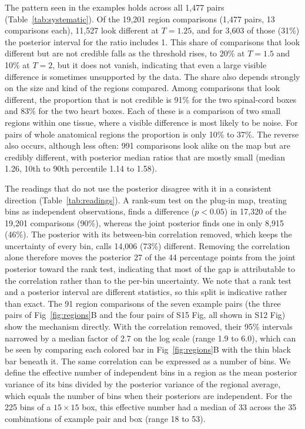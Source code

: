 \documentclass[10pt,letterpaper]{article}
\begin{document}
The pattern seen in the examples holds across all 1,477 pairs (Table~\ref{tab:systematic}). Of the 19,201 region comparisons (1,477 pairs, 13 comparisons each), 11,527 look different at $T = 1.25$, and for 3,603 of those (31\%) the posterior interval for the ratio includes 1. This share of comparisons that look different but are not credible falls as the threshold rises, to 20\% at $T = 1.5$ and 10\% at $T = 2$, but it does not vanish, indicating that even a large visible difference is sometimes unsupported by the data. The share also depends strongly on the size and kind of the regions compared. Among comparisons that look different, the proportion that is not credible is 91\% for the two spinal-cord boxes and 83\% for the two heart boxes. Each of these is a comparison of two small regions within one tissue, where a visible difference is most likely to be noise. For pairs of whole anatomical regions the proportion is only 10\% to 37\%. The reverse also occurs, although less often: 991 comparisons look alike on the map but are credibly different, with posterior median ratios that are mostly small (median 1.26, 10th to 90th percentile 1.14 to 1.58).

The readings that do not use the posterior disagree with it in a consistent direction (Table~\ref{tab:readings}). A rank-sum test on the plug-in map, treating bins as independent observations, finds a difference ($p < 0.05$) in 17,320 of the 19,201 comparisons (90\%), whereas the joint posterior finds one in only 8,915 (46\%). The posterior with its between-bin correlation removed, which keeps the uncertainty of every bin, calls 14,006 (73\%) different. Removing the correlation alone therefore moves the posterior 27 of the 44 percentage points from the joint posterior toward the rank test, indicating that most of the gap is attributable to the correlation rather than to the per-bin uncertainty. We note that a rank test and a posterior interval are different statistics, so this split is indicative rather than exact. The 91 region comparisons of the seven example pairs (the three pairs of Fig~\ref{fig:regions}B and the four pairs of S15 Fig, all shown in S12 Fig) show the mechanism directly. With the correlation removed, their 95\% intervals narrowed by a median factor of 2.7 on the log scale (range 1.9 to 6.0), which can be seen by comparing each colored bar in Fig~\ref{fig:regions}B with the thin black bar beneath it. The same correlation can be expressed as a number of bins. We define the effective number of independent bins in a region as the mean posterior variance of its bins divided by the posterior variance of the regional average, which equals the number of bins when their posteriors are independent. For the 225 bins of a $15\times15$ box, this effective number had a median of 33 across the 35 combinations of example pair and box (range 18 to 53).
\end{document}

